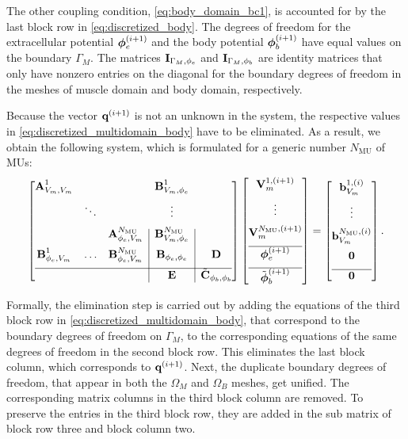 The other coupling condition, \cref{eq:body_domain_bc1}, is accounted for by the last block row in \cref{eq:discretized_body}. The degrees of freedom for the extracellular potential $\boldsymbol{\phi}_e^{(i+1)}$ and the body potential $\boldsymbol{\phi}_b^{(i+1)}$ have equal values on the boundary $\Gamma_M$. The matrices $\textbf{I}_{\Gamma_M,\phi_e}$ and $\textbf{I}_{\Gamma_M,\phi_b}$ are identity matrices that only have nonzero entries on the diagonal for the boundary degrees of freedom in the meshes of muscle domain and body domain, respectively.

Because the vector $\textbf{q}^{(i+1)}$ is not an unknown in the system, the respective values in \cref{eq:discretized_multidomain_body} have to be eliminated.
As a result, we obtain the following system, which is formulated for a generic number $N_\text{MU}$ of MUs:
%
\begin{align}\label{eq:discretized_multidomain_body2}
  \left[\begin{array}{@{}ccc|c|c@{}}
    \bfA_{V_m,V_m}^1 &&& \bfB_{V_m,\phi_e}^1 &\\[2mm]
    &\ddots&&\vdots&\\[2mm]
    &&\bfA_{\phi_e,V_m}^{N_\text{MU}} & \bfB_{V_m,\phi_e}^{N_\text{MU}}&\\[2mm]
    \bfB_{\phi_e,V_m}^1 & \dots & \bfB_{\phi_e,V_m}^{N_\text{MU}} & \bfB_{\phi_e,\phi_e} & \bfD \\[2mm] \hline
    &&&\bfE & \tilde{\bfC}_{\phi_b,\phi_b}
  \end{array}\right]
  \left[\begin{array}{@{}c@{}}
    \bfV_{m}^{1,(i+1)}  \\[2mm]
    \vdots\\[2mm]
    \bfV_{m}^{N_\text{MU},(i+1)}\\[2mm]\hline 
    \bfphi_{e}^{(i+1)} \\[2mm]\hline
    \tilde{\bfphi}_{b}^{(i+1)}
  \end{array}\right]
  = 
  \left[\begin{array}{@{}c@{}}
    \bfb_{V_m}^{1,(i)} \\[2mm]
    \vdots \\[2mm]
    \bfb_{V_m}^{N_\text{MU},(i)}\\[2mm]
    \bfzero\\[2mm]\hline
    \bfzero
  \end{array}\right].
\end{align}

Formally, the elimination step is carried out by adding the equations of the third block row in \cref{eq:discretized_multidomain_body}, that correspond to the boundary degrees of freedom on $\Gamma_M$, to the corresponding equations of the same degrees of freedom in the second block row. This eliminates the last block column, which corresponds to $\textbf{q}^{(i+1)}$. Next, the duplicate boundary degrees of freedom, that appear in both the $\Omega_M$ and $\Omega_B$ meshes, get unified. The corresponding matrix columns in the third block column are removed. To preserve the entries in the third block row, they are added in the sub matrix of block row three and block column two.

